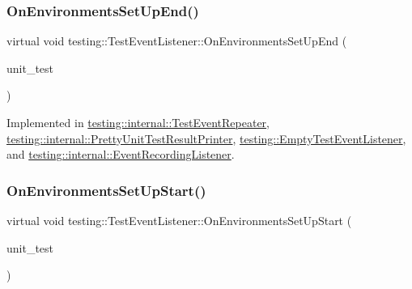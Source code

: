 \subsubsection{\texorpdfstring{OnEnvironmentsSetUpEnd()}{OnEnvironmentsSetUpEnd()}}
{\footnotesize\ttfamily virtual void testing\+::\+Test\+Event\+Listener\+::\+On\+Environments\+Set\+Up\+End (\begin{DoxyParamCaption}\item[{const \mbox{\hyperlink{classtesting_1_1UnitTest}{Unit\+Test}} \&}]{unit\+\_\+test }\end{DoxyParamCaption})\hspace{0.3cm}{\ttfamily [pure virtual]}}



Implemented in \mbox{\hyperlink{classtesting_1_1internal_1_1TestEventRepeater_a3a92696df942dc92f985e52fddd6d303}{testing\+::internal\+::\+Test\+Event\+Repeater}}, \mbox{\hyperlink{classtesting_1_1internal_1_1PrettyUnitTestResultPrinter_aadba892f02606a8b0c5f5982b3553aac}{testing\+::internal\+::\+Pretty\+Unit\+Test\+Result\+Printer}}, \mbox{\hyperlink{classtesting_1_1EmptyTestEventListener_abc481c6648d15d4242245195a06f5aa0}{testing\+::\+Empty\+Test\+Event\+Listener}}, and \mbox{\hyperlink{classtesting_1_1internal_1_1EventRecordingListener_a40b4c5e05abd1aa11a030f999f6adb8f}{testing\+::internal\+::\+Event\+Recording\+Listener}}.

\mbox{\label{classtesting_1_1TestEventListener_aa6502e534919605be45f26a6daf9a40c}} 
\subsubsection{\texorpdfstring{OnEnvironmentsSetUpStart()}{OnEnvironmentsSetUpStart()}}
{\footnotesize\ttfamily virtual void testing\+::\+Test\+Event\+Listener\+::\+On\+Environments\+Set\+Up\+Start (\begin{DoxyParamCaption}\item[{const \mbox{\hyperlink{classtesting_1_1UnitTest}{Unit\+Test}} \&}]{unit\+\_\+test }\end{DoxyParamCaption})\hspace{0.3cm}{\ttfamily [pure virtual]}}



